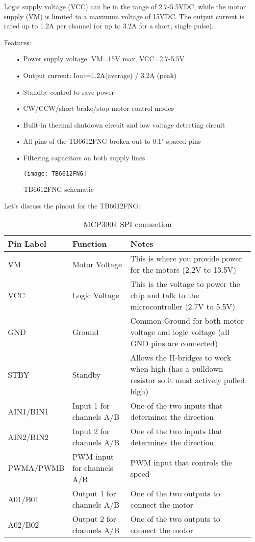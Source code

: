 \documentclass[
12pt, %
a4paper, %
oneside, %
headinclude,footinclude, %
BCOR5mm, %
]{scrartcl}
\begin{document}
Logic supply voltage (VCC) can be in the range of 2.7-5.5VDC, while the motor supply (VM) is limited to a maximum voltage of 15VDC. The output current is rated up to 1.2A per channel (or up to 3.2A for a short, single pulse).

Features:
\begin{itemize}
\item[•] Power supply voltage: VM=15V max, VCC=2.7-5.5V
\item[•] Output current: Iout=1.2A(average) / 3.2A (peak)
\item[•] Standby control to save power
\item[•] CW/CCW/short brake/stop motor control modes
\item[•] Built-in thermal shutdown circuit and low voltage detecting circuit
\item[•] All pins of the TB6612FNG broken out to 0.1" spaced pins
\item[•] Filtering capacitors on both supply lines
\end{itemize}

\begin{figure}[!htb]
\centering
\texttt{[image: TB6612FNG]} 
\caption[TB6612FNG schematic]{TB6612FNG schematic}
\label{fig:TB6612FNG}
\end{figure}
Let’s discuss the pinout for the TB6612FNG:


\newcolumntype{b}{X}

\begin{table}[hbt]
\caption{MCP3004 SPI connection}
\centering
\begin{adjustwidth}{-1cm}{}
\resizebox{16cm}{!} {%
\begin{tabularx}{18cm}{smb}
\toprule
Pin Label & Function & Notes \\
\midrule
VM & Motor Voltage  & This is where you provide power for the motors (2.2V to 13.5V)\\
VCC & Logic Voltage & This is the voltage to power the chip and talk to the microcontroller (2.7V to 5.5V)\\
GND & Ground  & Common Ground for both motor voltage and logic voltage (all GND pins are connected)\\
STBY & Standby & Allows the H-bridges to work when high (has a pulldown resistor so it must actively pulled high)\\
AIN1/BIN1 & Input 1 for channels A/B   & One of the two inputs that determines the direction\\
AIN2/BIN2 & Input 2 for channels A/B   & One of the two inputs that determines the direction\\
PWMA/PWMB & PWM input for channels A/B & PWM input that controls the speed\\
A01/B01 & Output 1 for channels A/B  & One of the two outputs to connect the motor\\
A02/B02 & Output 2 for channels A/B  & One of the two outputs to connect the motor\\
\bottomrule
\end{tabularx} } 
\end{adjustwidth}
\label{tab:label}
\end{table}
\end{document}
